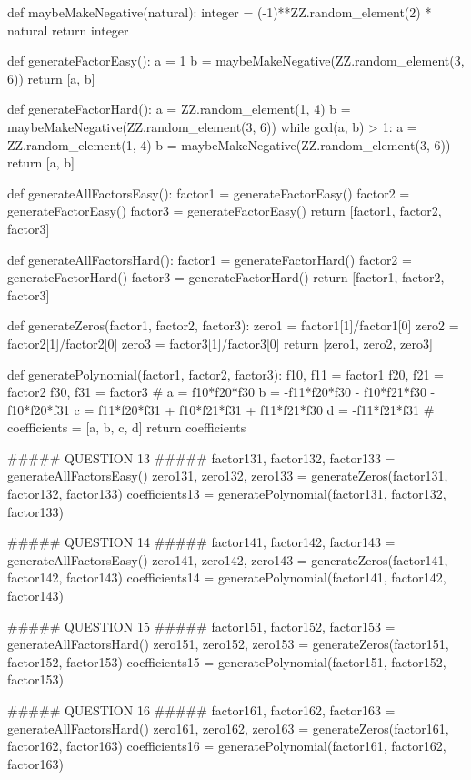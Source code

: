 \documentclass{ximera}
\begin{document}
\begin{sagesilent}
def maybeMakeNegative(natural):
    integer = (-1)**ZZ.random_element(2) * natural
    return integer

def generateFactorEasy():
    a = 1
    b = maybeMakeNegative(ZZ.random_element(3, 6))
    return [a, b]

def generateFactorHard():
    a = ZZ.random_element(1, 4)
    b = maybeMakeNegative(ZZ.random_element(3, 6))
    while gcd(a, b) > 1:
        a = ZZ.random_element(1, 4)
        b = maybeMakeNegative(ZZ.random_element(3, 6))
    return [a, b]

def generateAllFactorsEasy():
    factor1 = generateFactorEasy()
    factor2 = generateFactorEasy()
    factor3 = generateFactorEasy()
    return [factor1, factor2, factor3]

def generateAllFactorsHard():
    factor1 = generateFactorHard()
    factor2 = generateFactorHard()
    factor3 = generateFactorHard()
    return [factor1, factor2, factor3]

def generateZeros(factor1, factor2, factor3):
    zero1 = factor1[1]/factor1[0]
    zero2 = factor2[1]/factor2[0]
    zero3 = factor3[1]/factor3[0]
    return [zero1, zero2, zero3]

def generatePolynomial(factor1, factor2, factor3):
    f10, f11 = factor1
    f20, f21 = factor2
    f30, f31 = factor3
    #
    a = f10*f20*f30
    b = -f11*f20*f30 - f10*f21*f30 - f10*f20*f31
    c = f11*f20*f31 + f10*f21*f31 + f11*f21*f30
    d = -f11*f21*f31
    #
    coefficients = [a, b, c, d]
    return coefficients

##### QUESTION 13 #####
factor131, factor132, factor133 = generateAllFactorsEasy()
zero131, zero132, zero133 = generateZeros(factor131, factor132, factor133)
coefficients13 = generatePolynomial(factor131, factor132, factor133)

##### QUESTION 14 #####
factor141, factor142, factor143 = generateAllFactorsEasy()
zero141, zero142, zero143 = generateZeros(factor141, factor142, factor143)
coefficients14 = generatePolynomial(factor141, factor142, factor143)

##### QUESTION 15 #####
factor151, factor152, factor153 = generateAllFactorsHard()
zero151, zero152, zero153 = generateZeros(factor151, factor152, factor153)
coefficients15 = generatePolynomial(factor151, factor152, factor153)

##### QUESTION 16 #####
factor161, factor162, factor163 = generateAllFactorsHard()
zero161, zero162, zero163 = generateZeros(factor161, factor162, factor163)
coefficients16 = generatePolynomial(factor161, factor162, factor163)
\end{sagesilent}
\end{document}
